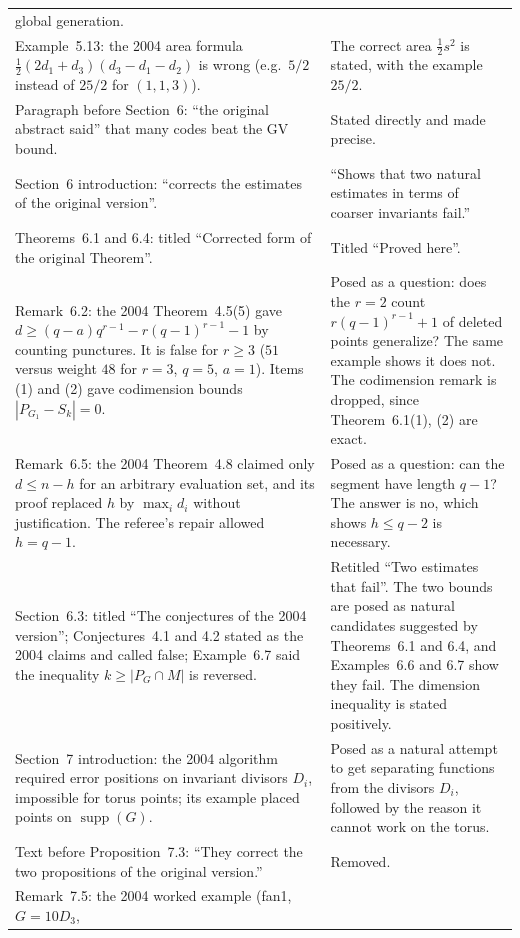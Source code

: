\documentclass[12pt,letterpaper]{article}
\DeclareMathOperator{\supp}{supp}
\begin{document}
\begin{longtable}{@{}L{0.47\textwidth}L{0.45\textwidth}@{}}
global generation.\\
Example~5.13: the 2004 area formula
$\tfrac12(2d_1+d_3)(d_3-d_1-d_2)$ is wrong (e.g.\ $5/2$ instead of $25/2$ for
$(1,1,3)$). & The correct area $\tfrac12s^2$ is stated, with the example
$25/2$.\\
Paragraph before Section~6: ``the original abstract said'' that many codes
beat the GV bound. & Stated directly and made precise.\\
Section~6 introduction: ``corrects the estimates of the original version''. &
``Shows that two natural estimates in terms of coarser invariants fail.''\\
Theorems~6.1 and 6.4: titled ``Corrected form of the original Theorem''. &
Titled ``Proved here''.\\
Remark~6.2: the 2004 Theorem~4.5(5) gave $d\ge(q-a)q^{r-1}-r(q-1)^{r-1}-1$ by
counting punctures. It is false for $r\ge3$ ($51$ versus weight $48$ for
$r=3$, $q=5$, $a=1$). Items (1) and (2) gave codimension bounds
$|P_{G_1}-S_k|=0$. & Posed as a question: does the $r=2$ count
$r(q-1)^{r-1}+1$ of deleted points generalize? The same example shows it does
not. The codimension remark is dropped, since Theorem~6.1(1), (2) are
exact.\\
Remark~6.5: the 2004 Theorem~4.8 claimed only $d\le n-h$ for an arbitrary
evaluation set, and its proof replaced $h$ by $\max_id_i$ without
justification. The referee's repair allowed $h=q-1$. & Posed as a question:
can the segment have length $q-1$? The answer is no, which shows $h\le q-2$
is necessary.\\
Section~6.3: titled ``The conjectures of the 2004 version''; Conjectures~4.1
and 4.2 stated as the 2004 claims and called false; Example~6.7 said the
inequality $k\ge|P_G\cap M|$ is reversed. & Retitled ``Two estimates that
fail''. The two bounds are posed as natural candidates suggested by
Theorems~6.1 and 6.4, and Examples~6.6 and 6.7 show they fail. The dimension
inequality is stated positively.\\
Section~7 introduction: the 2004 algorithm required error positions on
invariant divisors $D_i$, impossible for torus points; its example placed
points on $\supp(G)$. & Posed as a natural attempt to get separating
functions from the divisors $D_i$, followed by the reason it cannot work on
the torus.\\
Text before Proposition~7.3: ``They correct the two propositions of the
original version.'' & Removed.\\
Remark~7.5: the 2004 worked example (fan1, $G=10D_3$,

\end{longtable}
\end{document}
